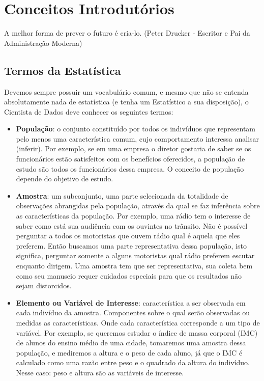 \chapter{Conceitos Introdutórios}

\begin{remark}
A melhor forma de prever o futuro é cria-lo. (Peter Drucker - Escritor e Pai da Administração Moderna) 
\end{remark}

\section{Termos da Estatística}
Devemos sempre possuir um vocabulário comum, e mesmo que não se entenda absolutamente nada de estatística (e tenha um Estatístico a sua disposição), o Cientista de Dados deve conhecer os seguintes termos:
\begin{itemize}
	\item \textbf{População}: o conjunto constituído por todos os indivíduos que representam pelo menos uma característica comum, cujo comportamento interessa analisar (inferir). Por exemplo, se em uma empresa o diretor gostaria de saber se os funcionários estão satisfeitos com os benefícios oferecidos, a população de estudo são todos os funcionários dessa empresa. O conceito de população depende do objetivo de estudo.
	\item \textbf{Amostra}: um subconjunto, uma parte selecionada da totalidade de observações abrangidas pela população, através da qual se faz inferência sobre as características da população. Por exemplo, uma rádio tem o interesse de saber como está sua audiência com os ouvintes no trânsito. Não é possível perguntar a todos os motoristas que ouvem rádio qual é aquela que eles preferem. Então buscamos uma parte representativa dessa população, isto significa, perguntar somente a alguns motoristas qual rádio preferem escutar enquanto dirigem. Uma amostra tem que ser representativa, sua coleta bem como seu manuseio requer cuidados especiais para que os resultados não sejam distorcidos. 
	\item \textbf{Elemento ou Variável de Interesse}: característica a ser observada em cada indivíduo da amostra. Componentes sobre o qual serão observadas ou medidas as características. Onde cada característica corresponde a um tipo de variável. Por exemplo, se queremos estudar o índice de massa corporal (IMC) de alunos do ensino médio de uma cidade, tomaremos uma amostra dessa população, e mediremos a altura e o peso de cada aluno, já que o IMC é calculado como uma razão entre peso e o quadrado da altura do indivíduo. Nesse caso: peso e altura são as variáveis de interesse.
\end{itemize}

